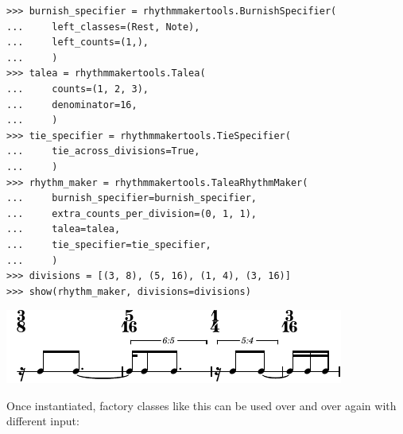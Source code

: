 \documentclass{article}
\begin{document}
\begin{lstlisting}
>>> burnish_specifier = rhythmmakertools.BurnishSpecifier(
...     left_classes=(Rest, Note),
...     left_counts=(1,),
...     )
>>> talea = rhythmmakertools.Talea(
...     counts=(1, 2, 3),
...     denominator=16,
...     )
>>> tie_specifier = rhythmmakertools.TieSpecifier(
...     tie_across_divisions=True,
...     )
>>> rhythm_maker = rhythmmakertools.TaleaRhythmMaker(
...     burnish_specifier=burnish_specifier,
...     extra_counts_per_division=(0, 1, 1),
...     talea=talea,
...     tie_specifier=tie_specifier,
...     )
>>> divisions = [(3, 8), (5, 16), (1, 4), (3, 16)]
>>> show(rhythm_maker, divisions=divisions)
\end{lstlisting}
\includegraphics{assets/lilypond-c238b5fdf445554d95cebd52911b461e.pdf}

\noindent Once instantiated, factory classes like this can be used over and
over again with different input:

\end{document}
